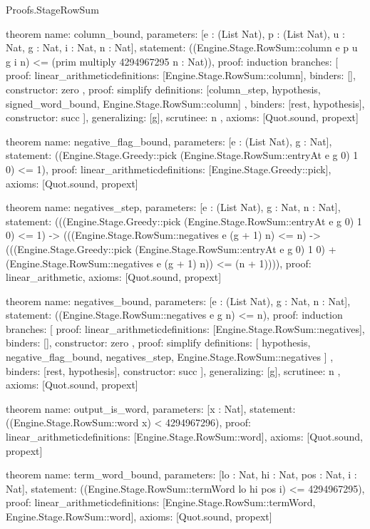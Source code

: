 \begin{lexlean}{Proofs.StageRowSum}
\begin{semanticmodule}
theorem{
  name: column_bound,
  parameters: [e : (List Nat), p : (List Nat), u : Nat, g : Nat, i : Nat, n : Nat],
  statement: ((Engine.Stage.RowSum::column e p u g i n) <= (prim multiply 4294967295 n : Nat)),
  proof: induction{
    branches: [
      {
        proof: linear_arithmetic{definitions: [Engine.Stage.RowSum::column]},
        binders: [],
        constructor: zero
      },
      {
        proof: simplify{
          definitions: [column_step, hypothesis, signed_word_bound, Engine.Stage.RowSum::column]
        },
        binders: [rest, hypothesis],
        constructor: succ
      }
    ],
    generalizing: [g],
    scrutinee: n
  },
  axioms: [Quot.sound, propext]
}

theorem{
  name: negative_flag_bound,
  parameters: [e : (List Nat), g : Nat],
  statement: ((Engine.Stage.Greedy::pick (Engine.Stage.RowSum::entryAt e g 0) 1 0) <= 1),
  proof: linear_arithmetic{definitions: [Engine.Stage.Greedy::pick]},
  axioms: [Quot.sound, propext]
}

theorem{
  name: negatives_step,
  parameters: [e : (List Nat), g : Nat, n : Nat],
  statement: (((Engine.Stage.Greedy::pick (Engine.Stage.RowSum::entryAt e g 0) 1 0) <= 1) -> (((Engine.Stage.RowSum::negatives e (g + 1) n) <= n) -> (((Engine.Stage.Greedy::pick (Engine.Stage.RowSum::entryAt e g 0) 1 0) + (Engine.Stage.RowSum::negatives e (g + 1) n)) <= (n + 1)))),
  proof: linear_arithmetic{},
  axioms: [Quot.sound, propext]
}

theorem{
  name: negatives_bound,
  parameters: [e : (List Nat), g : Nat, n : Nat],
  statement: ((Engine.Stage.RowSum::negatives e g n) <= n),
  proof: induction{
    branches: [
      {
        proof: linear_arithmetic{definitions: [Engine.Stage.RowSum::negatives]},
        binders: [],
        constructor: zero
      },
      {
        proof: simplify{
          definitions: [
            hypothesis,
            negative_flag_bound,
            negatives_step,
            Engine.Stage.RowSum::negatives
          ]
        },
        binders: [rest, hypothesis],
        constructor: succ
      }
    ],
    generalizing: [g],
    scrutinee: n
  },
  axioms: [Quot.sound, propext]
}

theorem{
  name: output_is_word,
  parameters: [x : Nat],
  statement: ((Engine.Stage.RowSum::word x) < 4294967296),
  proof: linear_arithmetic{definitions: [Engine.Stage.RowSum::word]},
  axioms: [Quot.sound, propext]
}

theorem{
  name: term_word_bound,
  parameters: [lo : Nat, hi : Nat, pos : Nat, i : Nat],
  statement: ((Engine.Stage.RowSum::termWord lo hi pos i) <= 4294967295),
  proof: linear_arithmetic{definitions: [Engine.Stage.RowSum::termWord, Engine.Stage.RowSum::word]},
  axioms: [Quot.sound, propext]
}


\end{semanticmodule}
\end{lexlean}
